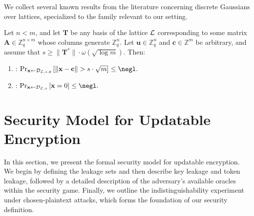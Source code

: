 \documentclass{fundam}
\begin{document}

\vspace{0.5cm}

We collect several known results from the literature concerning discrete Gaussians over lattices, specialized to the family relevant to our setting.
\begin{lemma}\label{lem::02}
	Let $n < m$, and let $\mathbf{T}$ be any basis of the lattice $\mathcal{L}$ corresponding to some matrix $\mathbf{A} \in \mathbb{Z}_q^{n \times m}$ whose columns generate $\mathbb{Z}_q^n$. Let $\mathbf{u} \in \mathbb{Z}_q^n$ and $\mathbf{c} \in \mathbb{Z}^m$ be arbitrary, and assume that $s \geq \| \mathbf{T}^* \| \cdot \omega\left( \sqrt{\log m} \right)$. Then:
	
	\begin{enumerate}
		\item {\normalfont \cite{micciancio2007worst,cash2012bonsai}:} 
		$\Pr_{\mathbf{x} \gets \mathcal{D}_{\Lat, s, \mathbf{c}}} \left[ \| \mathbf{x} - \mathbf{c} \| > s \cdot \sqrt{m} \right] \leq \negl.$
		\item {\normalfont \cite{peikert2006efficient,cash2012bonsai}:} 
		$\Pr_{\mathbf{x} \gets \mathcal{D}_{\Lat, s}} \left[ \mathbf{x} = 0 \right] \leq \negl.$
	\end{enumerate}
\end{lemma}


\section{Security Model for Updatable Encryption}
In this section, we present the formal security model for updatable encryption. We begin by defining the leakage sets and then describe key leakage and token leakage, followed by a detailed description of the adversary’s available oracles within the security game. Finally, we outline the indistinguishability experiment under chosen-plaintext attacks, which forms the foundation of our security definition.
\end{document}
